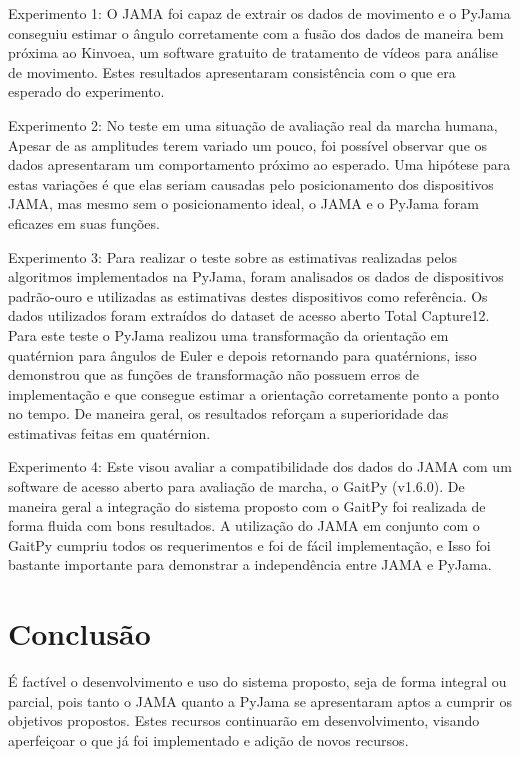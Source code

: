 \documentclass{article}
\begin{document}
Experimento 1: O JAMA foi capaz de extrair os dados de movimento e o PyJama conseguiu estimar o ângulo corretamente com a fusão dos dados de maneira bem próxima ao Kinvoea, um software gratuito de tratamento de vídeos para análise de movimento. Estes resultados apresentaram consistência com o que era esperado do experimento. 

Experimento 2: No teste em uma situação de avaliação real da marcha humana, Apesar de as amplitudes terem variado um pouco, foi possível observar que os dados apresentaram um comportamento próximo ao esperado. Uma hipótese para estas variações é que elas seriam causadas pelo posicionamento dos dispositivos JAMA, mas mesmo sem o posicionamento ideal, o JAMA e o PyJama foram eficazes em suas funções. 

Experimento 3: Para realizar o teste sobre as estimativas realizadas pelos algoritmos implementados na PyJama, foram analisados os dados de dispositivos padrão-ouro e utilizadas as estimativas destes dispositivos como referência. Os dados utilizados foram extraídos do dataset de acesso aberto Total Capture12. Para este teste o PyJama realizou uma transformação da orientação em quatérnion para ângulos de Euler e depois retornando para quatérnions, isso demonstrou que as funções de transformação não possuem erros de implementação e que consegue estimar a orientação corretamente ponto a ponto no tempo. De maneira geral, os resultados reforçam a superioridade das estimativas feitas em quatérnion. 

Experimento 4: Este visou avaliar a compatibilidade dos dados do JAMA com um software de acesso aberto para avaliação de marcha, o GaitPy (v1.6.0). De maneira geral a integração do sistema proposto com o GaitPy foi realizada de forma fluida com bons resultados. A utilização do JAMA em conjunto com o GaitPy cumpriu todos os requerimentos e foi de fácil implementação, e Isso foi bastante importante para demonstrar a independência entre JAMA e PyJama. 

\section{Conclusão}
É factível o desenvolvimento e uso do sistema proposto, seja de forma integral ou parcial, pois tanto o JAMA quanto a PyJama se apresentaram aptos a cumprir os objetivos propostos. Estes recursos continuarão em desenvolvimento, visando aperfeiçoar o que já foi implementado e adição de novos recursos. 
\end{document}
